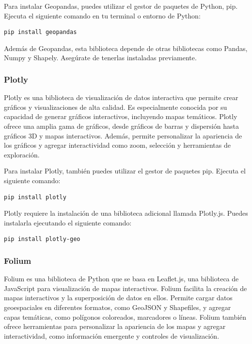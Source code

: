 \documentclass[
  a4paper,
]{article}
\begin{document}
Para instalar Geopandas, puedes utilizar el gestor de paquetes de
Python, pip. Ejecuta el siguiente comando en tu terminal o entorno de
Python:

\begin{verbatim}
pip install geopandas
\end{verbatim}

Además de Geopandas, esta biblioteca depende de otras bibliotecas como
Pandas, Numpy y Shapely. Asegúrate de tenerlas instaladas previamente.

\hypertarget{plotly}{%
\subsubsection{Plotly}\label{plotly}}

Plotly es una biblioteca de visualización de datos interactiva que
permite crear gráficos y visualizaciones de alta calidad. Es
especialmente conocida por su capacidad de generar gráficos
interactivos, incluyendo mapas temáticos. Plotly ofrece una amplia gama
de gráficos, desde gráficos de barras y dispersión hasta gráficos 3D y
mapas interactivos. Además, permite personalizar la apariencia de los
gráficos y agregar interactividad como zoom, selección y herramientas de
exploración.

Para instalar Plotly, también puedes utilizar el gestor de paquetes pip.
Ejecuta el siguiente comando:

\begin{verbatim}
pip install plotly
\end{verbatim}

Plotly requiere la instalación de una biblioteca adicional llamada
Plotly.js. Puedes instalarla ejecutando el siguiente comando:

\begin{verbatim}
pip install plotly-geo
\end{verbatim}

\hypertarget{folium}{%
\subsubsection{Folium}\label{folium}}

Folium es una biblioteca de Python que se basa en Leaflet.js, una
biblioteca de JavaScript para visualización de mapas interactivos.
Folium facilita la creación de mapas interactivos y la superposición de
datos en ellos. Permite cargar datos geoespaciales en diferentes
formatos, como GeoJSON y Shapefiles, y agregar capas temáticas, como
polígonos coloreados, marcadores o líneas. Folium también ofrece
herramientas para personalizar la apariencia de los mapas y agregar
interactividad, como información emergente y controles de visualización.
\end{document}
